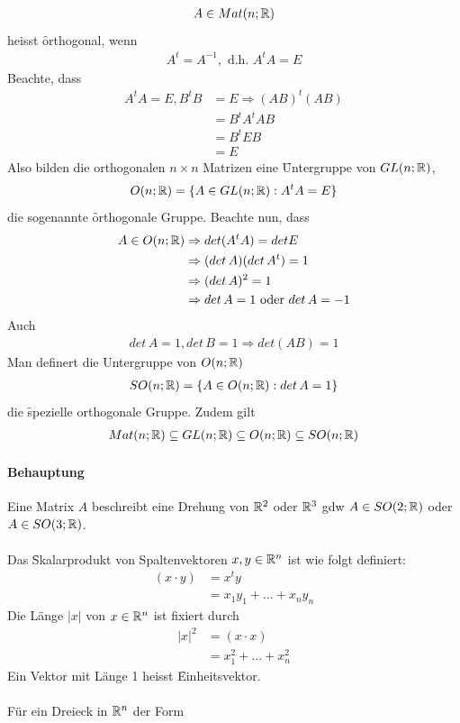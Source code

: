 \begin{align}
A \in Mat(n; \mathbb{R})
\end{align}
heisst \f{orthogonal}, wenn
\begin{align}
A^t = A^{-1}, \text{ d.h. } A^t A = E
\end{align}
Beachte, dass
\begin{align}
A^t A = E, B^t B &= E \Rightarrow (AB)^t (AB) \\
&= B^t A^t AB \\
&= B^t E B \\
&= E
\end{align}
Also bilden die orthogonalen $n \times n$ Matrizen eine \f{Untergruppe} von $GL(n; \mathbb{R})$,
\begin{align}
O(n; \mathbb{R}) = \{A \in GL(n; \mathbb{R}): A^t A = E\}
\end{align}
die sogenannte \f{orthogonale Gruppe}.
Beachte nun, dass
\begin{align}
A \in O(n; \mathbb{R}) &\Rightarrow det(A^t A) = det E \\
&\Rightarrow (det\, A)(det\, A^t) = 1 \\
&\Rightarrow (det\, A)^2 = 1 \\
&\Rightarrow det\, A = 1 \text{ oder } det\, A = -1 
\end{align}
Auch
\begin{align}
det\, A = 1, det\, B = 1 \Rightarrow det(AB) = 1
\end{align}
Man definert die Untergruppe von $O(n; \mathbb{R})$
\begin{align}
SO(n; \mathbb{R}) = \{A \in O(n; \mathbb{R}): det\, A = 1\}
\end{align}
die \f{spezielle orthogonale Gruppe}.
Zudem gilt
\begin{align}
Mat(n; \mathbb{R}) \subseteq GL(n; \mathbb{R}) \subseteq O(n; \mathbb{R}) \subseteq SO(n; \mathbb{R})
\end{align}

\paragraph{Behauptung}
Eine Matrix $A$ beschreibt eine Drehung von $\mathbb{R}^2$ oder $\mathbb{R}^3$ gdw $A \in SO(2; \mathbb{R})$ oder $A \in SO(3; \mathbb{R})$. \\\\
Das \f{Skalarprodukt} von Spaltenvektoren $x, y \in \mathbb{R}^n$ ist wie folgt definiert:
\begin{align}
(x \cdot y) &= x^t y \\
&= x_1 y_1 + ... + x_n y_n
\end{align}
Die Länge $|x|$ von $x \in \mathbb{R}^n$ ist fixiert durch
\begin{align}
|x|^2 &= (x \cdot x) \\
&= x_1^2 + ... + x_n^2
\end{align}
Ein Vektor mit Länge 1 heisst \f{Einheitsvektor}.\\\\
Für ein Dreieck in $\mathbb{R}^n$ der Form

